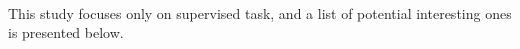 \documentclass[11pt]{report}
\begin{document}
\paragraph*{}
This study focuses only on supervised task, and a list of potential interesting ones is presented below.
\end{document}
